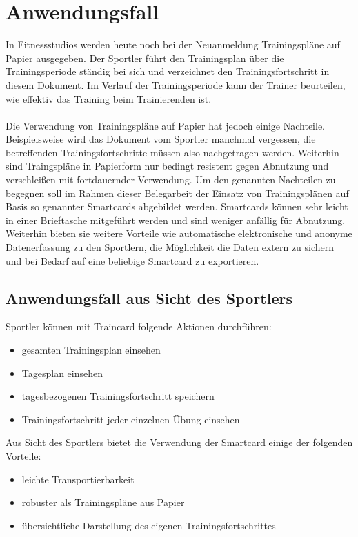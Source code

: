 \clearpage
\section{Anwendungsfall}
\label{sec:1}
In Fitnessstudios werden heute noch bei der Neuanmeldung Trainingspläne auf Papier ausgegeben. Der Sportler führt den Trainingsplan über die Trainingsperiode ständig bei sich und verzeichnet den Trainingsfortschritt in diesem Dokument.
Im Verlauf der Trainingsperiode kann der Trainer beurteilen, wie effektiv das Training beim Trainierenden ist.\\
\\
Die Verwendung von Trainingspläne auf Papier hat jedoch einige Nachteile. Beispielsweise wird das Dokument vom Sportler manchmal vergessen, die betreffenden Trainingsfortschritte müssen also nachgetragen werden. 
Weiterhin sind Traingspläne in Papierform nur bedingt resistent gegen Abnutzung und verschleißen mit fortdauernder Verwendung.
Um den genannten Nachteilen zu begegnen soll im Rahmen dieser Belegarbeit der Einsatz von Trainingsplänen
auf Basis so genannter Smartcards abgebildet werden. Smartcards können sehr leicht in einer Brieftasche mitgeführt werden und sind weniger anfällig für Abnutzung.
Weiterhin bieten sie weitere Vorteile wie automatische elektronische und anonyme Datenerfassung zu den Sportlern, die Möglichkeit die Daten extern zu sichern und bei Bedarf auf eine beliebige Smartcard zu exportieren.

\subsection{Anwendungsfall aus Sicht des Sportlers}
\label{subsec:1.1}

Sportler können mit Traincard folgende Aktionen durchführen:
\begin{itemize}
\item gesamten Trainingsplan einsehen
\item Tagesplan einsehen
\item tagesbezogenen Trainingsfortschritt speichern
\item Trainingsfortschritt jeder einzelnen Übung einsehen
\end{itemize}

Aus Sicht des Sportlers bietet die Verwendung der Smartcard einige der folgenden Vorteile:
\begin{itemize}
\item leichte Transportierbarkeit
\item robuster als Trainingspläne aus Papier
\item übersichtliche Darstellung des eigenen Trainingsfortschrittes
\end{itemize}


